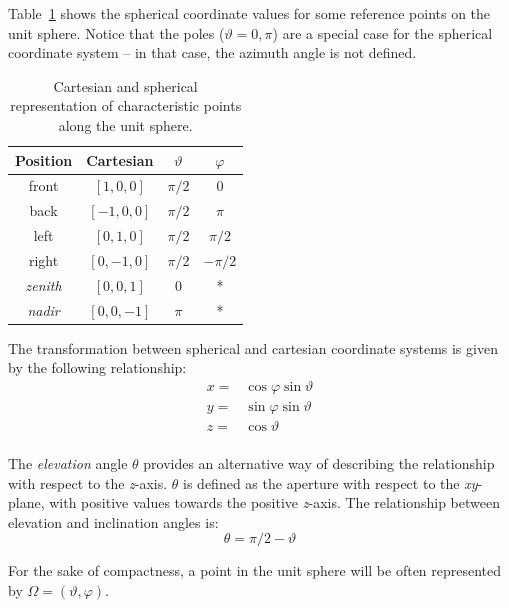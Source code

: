 Table~\ref{tab:cartesian} shows the spherical coordinate values for some reference points on the unit sphere.
Notice that the poles ($\vartheta = 0, \pi$) are a special case for the spherical coordinate system -- in that case, the azimuth angle is not defined. \\


\begin{table}[h]
\centering
\caption{Cartesian and spherical representation of characteristic points along the unit sphere.}
  \begin{tabular}{cccc}
  \toprule
    Position & Cartesian & $\vartheta$ & $\varphi$ \\
\midrule
	front & $[1, 0, 0]$ & $\pi/2$ & $0$ \\
	back & $[-1, 0, 0]$ & $\pi/2$ & $\pi$ \\
	left & $[0, 1, 0]$ & $\pi/2$ & $\pi/2$ \\
	right & $[0, -1, 0]$ & $\pi/2$ & $-\pi/2$ \\
    \textit{zenith} & $[0, 0, 1]$ & $0$ & * \\
    \textit{nadir}  & $[0, 0, -1]$ & $\pi$ & * \\
    \bottomrule
  \end{tabular}
\label{tab:cartesian}
\end{table}


The transformation between spherical and cartesian coordinate systems is given by the following relationship:
\begin{equation}
	\begin{aligned}
		x = & \cos{\varphi} \sin{\vartheta}\\
		y = & \sin{\varphi} \sin{\vartheta}\\
		z = & \cos{\vartheta}\\
	\end{aligned}
\end{equation}

The \textit{elevation} angle $\theta$ provides an alternative way of describing the relationship with respect to the \textit{z}-axis. $\theta$ is defined as  the aperture with respect to the \textit{xy}-plane, with positive values towards the positive \textit{z}-axis. The relationship between elevation and inclination angles is:
\begin{equation}
	\theta = \pi/2 - \vartheta
\end{equation}


For the sake of compactness, a point in the unit sphere will be often represented by $\Omega = (\vartheta, \varphi)$.\\

